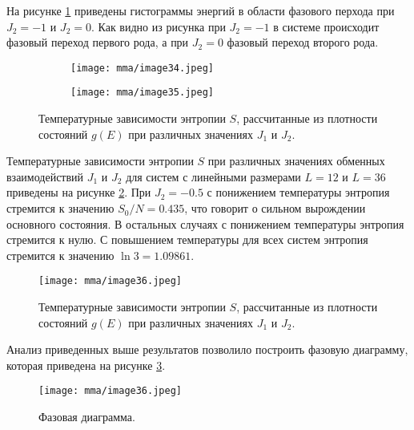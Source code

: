 На рисунке \ref{mma-fig-9} приведены гистограммы энергий в области фазового перхода при $J_2 = -1$ и $J_2 = 0$. Как видно из рисунка при $J_2 = -1$ в системе происходит фазовый переход первого рода, а при $J_2 = 0$ фазовый переход второго рода.
\begin{figure}[h]
    \begin{center}
        \begin{subfigure}{0.45\textwidth}
            \begin{center}
                \texttt{[image: mma/image34.jpeg]}
            \end{center}
        \end{subfigure}
        \begin{subfigure}{0.45\textwidth}
            \begin{center}
                \texttt{[image: mma/image35.jpeg]}
            \end{center}
        \end{subfigure}
    \end{center}
    \caption{Температурные зависимости энтропии $S$, рассчитанные из плотности состояний $g(E)$ при различных значениях $J_1$ и $J_2$.}
    \label{mma-fig-9}
\end{figure}

Температурные зависимости энтропии $S$ при различных значениях обменных взаимодействий $J_1$ и $J_2$ для систем с линейными размерами $L=12$ и $L=36$ приведены на рисунке \ref{mma-fig-10}. При $J_2 = -0.5$ с понижением температуры энтропия стремится к значению $S_0/N = 0.435$, что говорит о сильном вырождении основного состояния. В остальных случаях с понижением температуры энтропия стремится к нулю. С повышением температуры для всех систем энтропия стремится к значению $\ln3 = 1.09861$.
\begin{figure}[h]
    \begin{center}
        \texttt{[image: mma/image36.jpeg]}
    \end{center}
    \caption{Температурные зависимости энтропии $S$, рассчитанные из плотности состояний $g(E)$ при различных значениях $J_1$ и $J_2$.}
    \label{mma-fig-10}
\end{figure}

Анализ приведенных выше результатов позволило построить фазовую диаграмму, которая приведена на рисунке \ref{mma-fig-11}.
\begin{figure}[h]
    \begin{center}
        \texttt{[image: mma/image36.jpeg]}
    \end{center}
    \caption{Фазовая диаграмма.}
    \label{mma-fig-11}
\end{figure}


